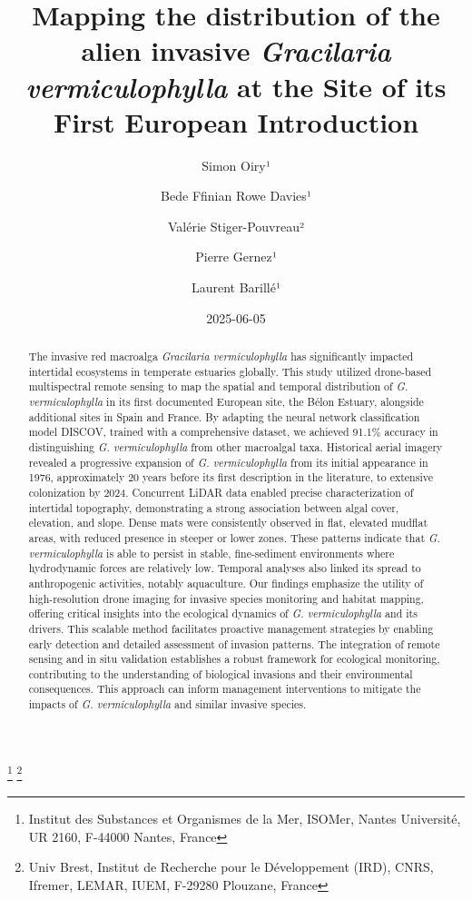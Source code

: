 \documentclass[
  letterpaper,
  DIV=11,
  numbers=noendperiod]{scrartcl}
\title{Mapping the distribution of the alien invasive \emph{Gracilaria
vermiculophylla} at the Site of its First European Introduction}
\author{Simon Oiry¹ \and Bede Ffinian Rowe Davies¹ \and Valérie
Stiger-Pouvreau² \and Pierre Gernez¹ \and Laurent Barillé¹}
\date{2025-06-05}
\begin{document}
\maketitle
\begin{abstract}
The invasive red macroalga \emph{Gracilaria vermiculophylla} has
significantly impacted intertidal ecosystems in temperate estuaries
globally. This study utilized drone-based multispectral remote sensing
to map the spatial and temporal distribution of \emph{G.
vermiculophylla} in its first documented European site, the Bélon
Estuary, alongside additional sites in Spain and France. By adapting the
neural network classification model DISCOV, trained with a comprehensive
dataset, we achieved 91.1\% accuracy in distinguishing \emph{G.
vermiculophylla} from other macroalgal taxa. Historical aerial imagery
revealed a progressive expansion of \emph{G. vermiculophylla} from its
initial appearance in 1976, approximately 20 years before its first
description in the literature, to extensive colonization by 2024.
Concurrent LiDAR data enabled precise characterization of intertidal
topography, demonstrating a strong association between algal cover,
elevation, and slope. Dense mats were consistently observed in flat,
elevated mudflat areas, with reduced presence in steeper or lower zones.
These patterns indicate that \emph{G. vermiculophylla} is able to
persist in stable, fine-sediment environments where hydrodynamic forces
are relatively low. Temporal analyses also linked its spread to
anthropogenic activities, notably aquaculture. Our findings emphasize
the utility of high-resolution drone imaging for invasive species
monitoring and habitat mapping, offering critical insights into the
ecological dynamics of \emph{G. vermiculophylla} and its drivers. This
scalable method facilitates proactive management strategies by enabling
early detection and detailed assessment of invasion patterns. The
integration of remote sensing and in situ validation establishes a
robust framework for ecological monitoring, contributing to the
understanding of biological invasions and their environmental
consequences. This approach can inform management interventions to
mitigate the impacts of \emph{G. vermiculophylla} and similar invasive
species.
\end{abstract}


\footnote{Institut des Substances et Organismes de la Mer, ISOMer,
  Nantes Université, UR 2160, F-44000 Nantes, France} \footnote{Univ
  Brest, Institut de Recherche pour le Développement (IRD), CNRS,
  Ifremer, LEMAR, IUEM, F-29280 Plouzane, France}
\end{document}
